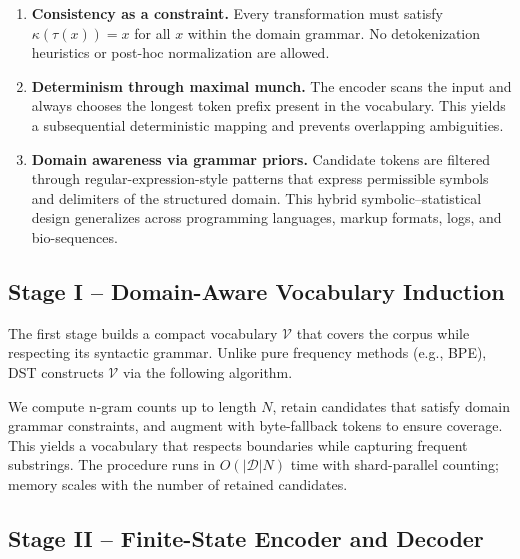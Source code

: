 \begin{enumerate}
  \item \textbf{Consistency as a constraint.}
        Every transformation must satisfy
        $\kappa(\tau(x))\!=\!x$ for all $x$
        within the domain grammar. No detokenization heuristics
        or post-hoc normalization are allowed.

  \item \textbf{Determinism through maximal munch.}
        The encoder scans the input and always chooses
        the longest token prefix present in the vocabulary.
        This yields a subsequential deterministic mapping
        and prevents overlapping ambiguities.

  \item \textbf{Domain awareness via grammar priors.}
        Candidate tokens are filtered through
        regular-expression-style patterns that express
        permissible symbols and delimiters
        of the structured domain.
        This hybrid symbolic–statistical design
        generalizes across programming languages,
        markup formats, logs, and bio-sequences.
\end{enumerate}

\subsection{Stage I – Domain-Aware Vocabulary Induction}
\label{sec:method-vocab}

The first stage builds a compact vocabulary $\mathcal{V}$
that covers the corpus while respecting its syntactic grammar.
Unlike pure frequency methods (e.g., BPE),
DST constructs $\mathcal{V}$ via the following algorithm.

We compute n-gram counts up to length $N$, retain candidates that satisfy domain grammar constraints, and augment with byte-fallback tokens to ensure coverage. This yields a vocabulary that respects boundaries while capturing frequent substrings. The procedure runs in $O(|\mathcal{D}|N)$ time with shard-parallel counting; memory scales with the number of retained candidates.

\subsection{Stage II – Finite-State Encoder and Decoder}
\label{sec:method-fst}

